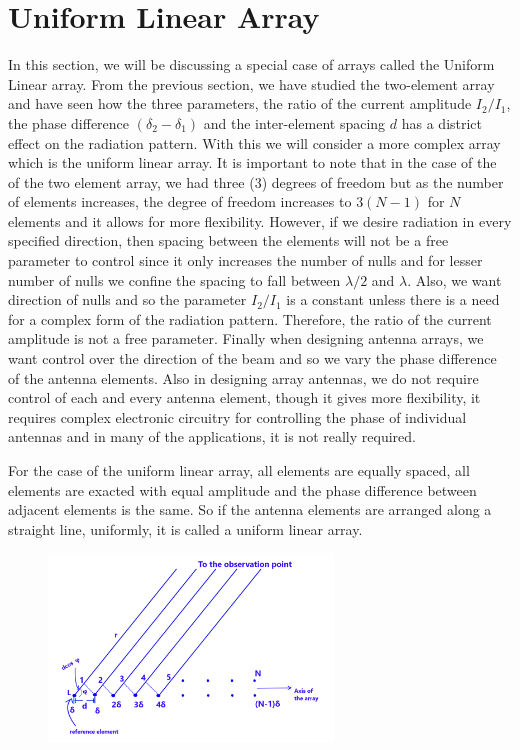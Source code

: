 \chapter{Uniform Linear Array}
In this section, we will be discussing a special case of arrays called the Uniform Linear array. From the previous section, we have studied the two-element array and have seen how the three parameters, the ratio of the current amplitude $I_{2} / I_{1}$, the phase difference $\left(\delta_2 - \delta_1\right)$ and the inter-element spacing $d$ has a district effect on the radiation pattern. With this we will consider a more complex array which is the uniform linear array. It is important to note that in the case of the of the two element array, we had three (3) degrees of freedom but as the number of elements increases, the degree of freedom increases to $3(N -1)$ for $N$ elements and it allows for more flexibility. However, if we desire radiation in every specified direction, then spacing between the elements will not be a free parameter to control since it only increases the number of nulls and for lesser number of nulls we confine the spacing to fall between $\lambda/2$ and $\lambda$. Also, we want direction of nulls and so the parameter $I_{2} / I_{1}$ is a constant unless there is a need for a complex form of the radiation pattern. Therefore, the ratio of the current amplitude is not a free parameter. Finally when designing antenna arrays, we want control over the direction of the beam and so we vary the phase difference of the antenna elements. Also in designing array antennas, we do not require control of each and every antenna element, though it gives more flexibility, it requires complex electronic circuitry for controlling the phase of individual antennas and in many of the applications, it is not really required.

For the case of the uniform linear array, all elements are equally spaced, all elements are exacted with equal amplitude and the phase difference between adjacent elements is the same. So if the antenna elements are arranged along a straight line, uniformly, it is called a uniform linear array.
\begin{figure}[h]
\centering
\includegraphics[height=5cm]{./graphics/fig53_1}
\caption{}
\label{53.1}
\end{figure}

